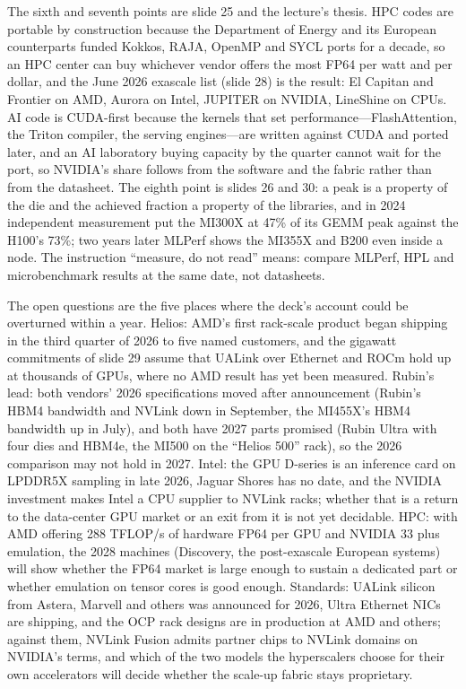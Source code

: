 \documentclass[11pt,letterpaper]{article}
\begin{document}
The sixth and seventh points are slide 25 and the lecture's thesis. HPC codes are portable by construction because the Department of Energy and its European counterparts funded Kokkos, RAJA, OpenMP and SYCL ports for a decade, so an HPC center can buy whichever vendor offers the most FP64 per watt and per dollar, and the June 2026 exascale list (slide 28) is the result: El Capitan and Frontier on AMD, Aurora on Intel, JUPITER on NVIDIA, LineShine on CPUs. AI code is CUDA-first because the kernels that set performance---FlashAttention, the Triton compiler, the serving engines---are written against CUDA and ported later, and an AI laboratory buying capacity by the quarter cannot wait for the port, so NVIDIA's share follows from the software and the fabric rather than from the datasheet. The eighth point is slides 26 and 30: a peak is a property of the die and the achieved fraction a property of the libraries, and in 2024 independent measurement put the MI300X at 47\% of its GEMM peak against the H100's 73\%; two years later MLPerf shows the MI355X and B200 even inside a node. The instruction ``measure, do not read'' means: compare MLPerf, HPL and microbenchmark results at the same date, not datasheets.

The open questions are the five places where the deck's account could be overturned within a year. Helios: AMD's first rack-scale product began shipping in the third quarter of 2026 to five named customers, and the gigawatt commitments of slide 29 assume that UALink over Ethernet and ROCm hold up at thousands of GPUs, where no AMD result has yet been measured. Rubin's lead: both vendors' 2026 specifications moved after announcement (Rubin's HBM4 bandwidth and NVLink down in September, the MI455X's HBM4 bandwidth up in July), and both have 2027 parts promised (Rubin Ultra with four dies and HBM4e, the MI500 on the ``Helios 500'' rack), so the 2026 comparison may not hold in 2027. Intel: the GPU D-series is an inference card on LPDDR5X sampling in late 2026, Jaguar Shores has no date, and the NVIDIA investment makes Intel a CPU supplier to NVLink racks; whether that is a return to the data-center GPU market or an exit from it is not yet decidable. HPC: with AMD offering 288 TFLOP/s of hardware FP64 per GPU and NVIDIA 33 plus emulation, the 2028 machines (Discovery, the post-exascale European systems) will show whether the FP64 market is large enough to sustain a dedicated part or whether emulation on tensor cores is good enough. Standards: UALink silicon from Astera, Marvell and others was announced for 2026, Ultra Ethernet NICs are shipping, and the OCP rack designs are in production at AMD and others; against them, NVLink Fusion admits partner chips to NVLink domains on NVIDIA's terms, and which of the two models the hyperscalers choose for their own accelerators will decide whether the scale-up fabric stays proprietary.
\end{document}
